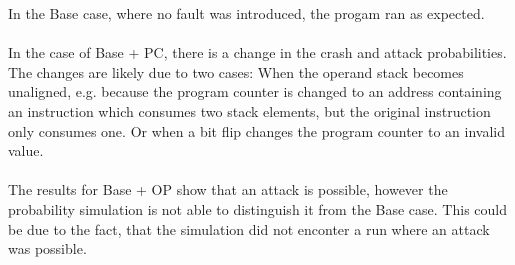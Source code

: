 In the Base case, where no fault was introduced, the progam ran as expected.\\\\
In the case of Base + PC, there is a change in the crash and attack probabilities. The changes are likely due to two cases: When the operand stack becomes unaligned, e.g. because the program counter is changed to an address containing an instruction which consumes two stack elements, but the original instruction only consumes one. Or when a bit flip changes the program counter to an invalid value.\\\\
The results for Base + OP show that an attack is possible, however the probability simulation is not able to distinguish it from the Base case. This could be due to the fact, that the simulation did not enconter a run where an attack was possible.\\\\